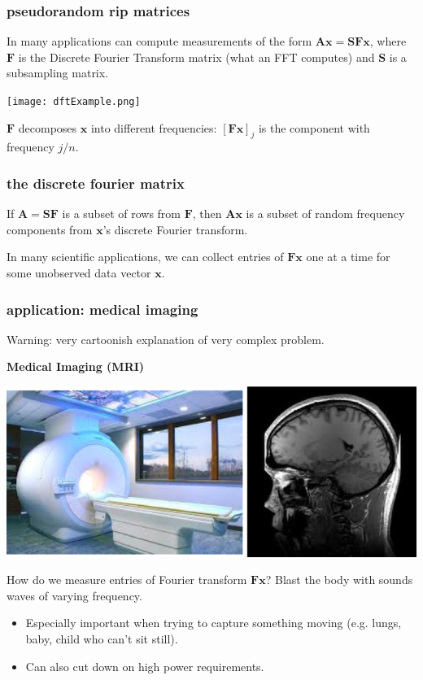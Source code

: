\documentclass[compress]{beamer}
\newcommand{\bv}[1]{\mathbf{#1}}
\begin{document}
\begin{frame}
	\frametitle{pseudorandom rip matrices}
	In many applications can compute measurements of the form $\bv{Ax} = \bv{S}\bv{F}\bv{x}$, where $\bv{F}$ is the Discrete Fourier Transform matrix (what an FFT computes) and $\bv{S}$ is a subsampling matrix. 
	\begin{center}
		\texttt{[image: dftExample.png]}
		
		$\bv{F}$ decomposes $\bv{x}$ into different frequencies: $[\bv{F}\bv{x}]_j$ is the component with frequency $j/n$. 
		
	\end{center}
	
\end{frame}

\begin{frame}
	\frametitle{the discrete fourier matrix}
	If $\bv{A} = \bv{SF}$ is a subset of rows from $\bv{F}$, then $\bv{A}\bv{x}$ is a subset of random frequency components from $\bv{x}$'s discrete Fourier transform. 
	
	In many scientific applications, we can collect entries of $\bv{F}\bv{x}$ one at a time for some unobserved data vector $\bv{x}$. 
\end{frame}

\begin{frame}
	\frametitle{application: medical imaging}
	\begin{center}
		\alert{Warning: very cartoonish explanation of very complex problem.}		
	\end{center}
		\vspace{-1em}
	\textbf{Medical Imaging (MRI)}
	\begin{center}
		\includegraphics[width=.6\textwidth]{medicalImages.png}
	\end{center}
	
	\begin{center}
		How do we measure entries of Fourier transform $\bv{Fx}$? 		Blast the body with sounds waves of varying frequency.
	\end{center}

	\begin{itemize}
	\item Especially important when trying to capture something moving (e.g. lungs, baby, child who can't sit still). 
	\item Can also cut down on high power requirements.
\end{itemize}
\end{frame}
\end{document}
